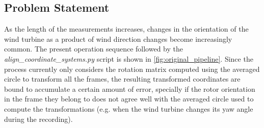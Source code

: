 \documentclass[12pt, a4paper, bibliography=totoc]{scrarticle}
\begin{document}
	\subsection{Problem Statement}
	As the length of the measurements increases, changes in the orientation of the wind turbine as a product of wind direction changes become increasingly common. The present operation sequence followed by the \textit{align\_coordinate\_systems.py} script is shown in \cref{fig:original_pipeline}. Since the process currently only considers the rotation matrix computed using the averaged circle to transform all the frames, the resulting transformed coordinates are bound to accumulate a certain amount of error, specially if the rotor orientation in the frame they belong to does not agree well with the averaged circle used to compute the transformations (e.g. when the wind turbine changes its yaw angle during the recording).
\end{document}
